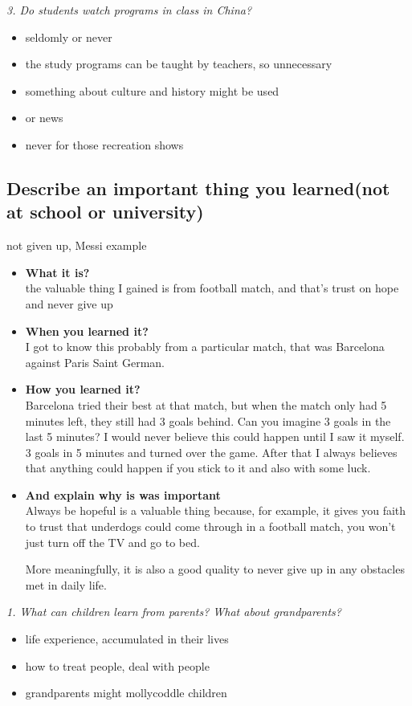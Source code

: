 \documentclass[conference]{IEEEtran}
\begin{document}
\textit{3. Do students watch programs in class in China?}
\begin{itemize}
    \item seldomly or never
    \item the study programs can be taught by teachers, so unnecessary
    \item something about culture and history might be used
    \item or news
    \item never for those recreation shows
\end{itemize}


\subsection{Describe an important thing you learned(not at school or university)}
not given up, Messi example
\begin{itemize}
    \item \textbf{What it is?}\\
    the valuable thing I gained is from football match, and that's trust on hope and never give up
    \item \textbf{When you learned it?}\\
    I got to know this probably from a particular match, that was Barcelona against Paris Saint German.
    \item \textbf{How you learned it?}\\
    Barcelona tried their best at that match, but when the match only had 5 minutes left, they still had 3 goals behind.
    Can you imagine 3 goals in the last 5 minutes? 
    I would never believe this could happen until I saw it myself. 3 goals in 5 minutes and turned over the game.
    After that I always believes that anything could happen if you stick to it and also with some luck. 
    \item \textbf{And explain why is was important}\\
    Always be hopeful is a valuable thing because, for example, it gives you faith to trust that underdogs could come through
    in a football match, you won't just turn off the TV and go to bed.

    More meaningfully, it is also a good quality to never give up in any obstacles met in daily life.
\end{itemize}

\textit{1. What can children learn from parents? What about grandparents?}
\begin{itemize}
    \item life experience, accumulated in their lives
    \item how to treat people, deal with people
    \item grandparents might mollycoddle children
\end{itemize}
\end{document}
